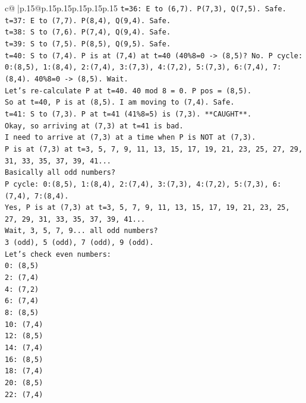 \documentclass{article}
\begin{document}
{\begin{supertabular}{c@{$\;$}|p{.15\linewidth}@{}p{.15\linewidth}p{.15\linewidth}p{.15\linewidth}p{.15\linewidth}p{.15\linewidth}}
{{{\texttt{t=36: E to (6,7). P(7,3), Q(7,5). Safe.} \\
\texttt{t=37: E to (7,7). P(8,4), Q(9,4). Safe.} \\
\texttt{t=38: S to (7,6). P(7,4), Q(9,4). Safe.} \\
\texttt{t=39: S to (7,5). P(8,5), Q(9,5). Safe.} \\
\texttt{t=40: S to (7,4). P is at (7,4) at t=40 (40\%8=0 {-}> (8,5)? No. P cycle: 0:(8,5), 1:(8,4), 2:(7,4), 3:(7,3), 4:(7,2), 5:(7,3), 6:(7,4), 7:(8,4). 40\%8=0 {-}> (8,5). Wait.} \\
\texttt{Let's re{-}calculate P at t=40. 40 mod 8 = 0. P pos = (8,5).} \\
\texttt{So at t=40, P is at (8,5). I am moving to (7,4). Safe.} \\
\texttt{t=41: S to (7,3). P at t=41 (41\%8=5) is (7,3). **CAUGHT**.} \\
\texttt{Okay, so arriving at (7,3) at t=41 is bad.} \\
\texttt{I need to arrive at (7,3) at a time when P is NOT at (7,3).} \\
\texttt{P is at (7,3) at t=3, 5, 7, 9, 11, 13, 15, 17, 19, 21, 23, 25, 27, 29, 31, 33, 35, 37, 39, 41...} \\
\texttt{Basically all odd numbers?} \\
\texttt{P cycle: 0:(8,5), 1:(8,4), 2:(7,4), 3:(7,3), 4:(7,2), 5:(7,3), 6:(7,4), 7:(8,4).} \\
\texttt{Yes, P is at (7,3) at t=3, 5, 7, 9, 11, 13, 15, 17, 19, 21, 23, 25, 27, 29, 31, 33, 35, 37, 39, 41...} \\
\texttt{Wait, 3, 5, 7, 9... all odd numbers?} \\
\texttt{3 (odd), 5 (odd), 7 (odd), 9 (odd).} \\
\texttt{Let's check even numbers:} \\
\texttt{0: (8,5)} \\
\texttt{2: (7,4)} \\
\texttt{4: (7,2)} \\
\texttt{6: (7,4)} \\
\texttt{8: (8,5)} \\
\texttt{10: (7,4)} \\
\texttt{12: (8,5)} \\
\texttt{14: (7,4)} \\
\texttt{16: (8,5)} \\
\texttt{18: (7,4)} \\
\texttt{20: (8,5)} \\
\texttt{22: (7,4)} \\
}}}
\end{supertabular}}
\end{document}
